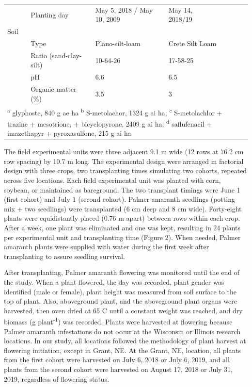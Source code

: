 \documentclass[utf8]{frontiersSCNS}
\begin{document}
\begin{table}[!h]
{\begin{tabular}[t]{lllllll}
\multirow{-6}{*}{\raggedright\arraybackslash } & Planting day & May 5, 2018 / May 10, 2009 & May 14, 2018/19 &  &  & \\

Soil &  &  &  &  &  & \\

 & Type & Plano-silt-loam & Crete Silt Loam &  &  & \\

 & Ratio (sand-clay-silt) & 10-64-26 & 17-58-25 &  &  & \\

 & pH & 6.6 & 6.5 &  &  & \\

\multirow{-4}{*}{\raggedright\arraybackslash } & Organic matter (\%) & 3.5 & 3 &  &  & \\
\bottomrule
\multicolumn{7}{l}{\rule{0pt}{1em}\textsuperscript{a} glyphoste, 840 g ae ha \textsuperscript{b} S-metolachor, 1324 g ai ha; \textsuperscript{c} S-metolachlor + trazine + mesotrione, + bicyclopyrone, 2409 g ai ha; \textsuperscript{d} saflufenacil + imazethapyr + pyroxasulfone, 215 g ai ha}\\
\end{tabular}}
\end{table}

The field experimental units were three adjacent 9.1 m wide (12 rows at
76.2 cm row spacing) by 10.7 m long. The experimental design were
arranged in factorial design with three crops, two transplanting times
simulating two cohorts, repeated across five locations. Each field
experimental unit was planted with corn, soybean, or maintained as
bareground. The two transplant timings were June 1 (first cohort) and
July 1 (second cohort). Palmer amaranth seedlings (potting mix + two
seedlings) were transplanted (6 cm deep and 8 cm wide). Forty-eight
plants were equidistantly placed (0.76 m apart) between rows within each
crop. After a week, one plant was eliminated and one was kept, resulting
in 24 plants per experimental unit and transplanting time (Figure 2).
When needed, Palmer amaranth plants were supplied with water during the
first week after transplanting to assure seedling survival.

After transplanting, Palmer amaranth flowering was monitored until the
end of the study. When a plant flowered, the day was recorded, plant
gender was identified (male or female), plant height was measured from
soil surface to the top of plant. Also, aboveground plant, and the
aboveground plant organs were harvested, then oven dried at 65 C until a
constant weight was reached, and dry biomass (g
plant\textsuperscript{-1}) was recorded. Plants were harvested at
flowering because Palmer amaranth infestations do not occur at the
Wisconsin or Illinois research locations. In our study, all locations
followed the methodology of plant harvest at flowering initiation,
except in Grant, NE. At the Grant, NE, location, all plants from the
first cohort were harvested on July 6, 2018 or July 6, 2019, and all
plants from the second cohort were harvested on August 17, 2018 or July
31, 2019, regardless of flowering status.
\end{document}
